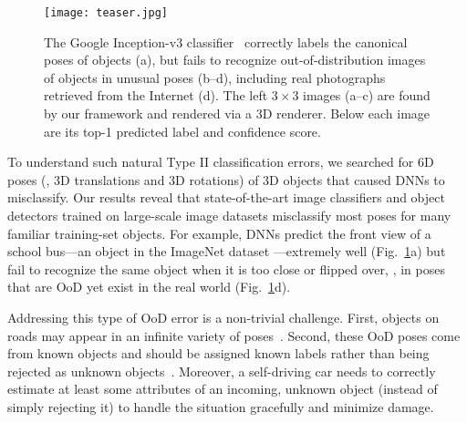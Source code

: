\documentclass[10pt,twocolumn,letterpaper]{article}
\newcommand{\x}{\mathbf{x}}
\begin{document}
\begin{figure}[t]
	\texttt{[image: teaser.jpg]}
	
	\caption{
		The Google Inception-v3 classifier~\cite{szegedy2016rethinking} correctly labels the canonical poses of objects (a), but fails to recognize out-of-distribution images of objects in unusual poses (b--d), including real photographs retrieved from the Internet (d).
		The left $3 \times 3$ images (a--c) are found by our framework and rendered via a 3D renderer.
		Below each image are its top-1 predicted label and confidence score.
	}\label{fig:teaser}
\end{figure}

To understand such natural Type II classification errors, we searched for 6D poses (\ie, 3D translations and 3D rotations) of 3D objects that caused DNNs to misclassify.
Our results reveal that state-of-the-art image classifiers and object detectors trained on large-scale image datasets \cite{russakovsky2015imagenet,lin2014microsoft} misclassify most poses for many familiar training-set objects.
For example, DNNs predict the front view of a school bus---an object in the ImageNet dataset \cite{russakovsky2015imagenet}---extremely well (Fig.~\ref{fig:teaser}a) but fail to recognize the same object when it is too close or flipped over, \ie, in poses that are OoD yet exist in the real world (Fig.~\ref{fig:teaser}d).




Addressing this type of OoD error is a non-trivial challenge.
First, objects on roads may appear in an infinite variety of poses~\cite{tesla2016killed,uber2017killed}.
Second, these OoD poses come from known objects and should be assigned known labels rather than being rejected as unknown objects~\cite{hendrycks2016baseline,scheirer2013toward}.
Moreover, a self-driving car needs to correctly estimate at least some attributes of an incoming, unknown object (instead of simply rejecting it) to handle the situation gracefully and minimize damage.
\end{document}
